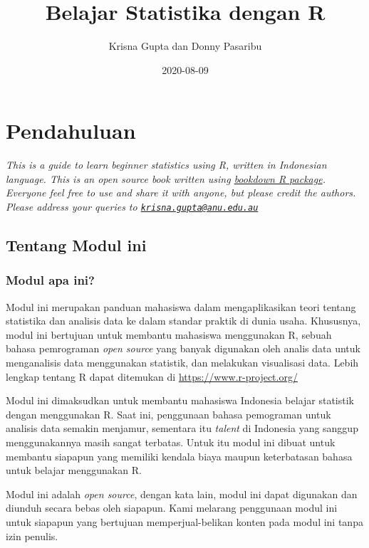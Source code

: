 \documentclass[
]{book}
\title{Belajar Statistika dengan R}
\author{Krisna Gupta dan Donny Pasaribu}
\date{2020-08-09}
\begin{document}
\maketitle

{
\setcounter{tocdepth}{1}
\tableofcontents
}
\hypertarget{pendahuluan}{%
\chapter{Pendahuluan}\label{pendahuluan}}

\emph{This is a guide to learn beginner statistics using R, written in Indonesian language. This is an open source book written using \href{https://bookdown.org/yihui/bookdown/}{bookdown R package}. Everyone feel free to use and share it with anyone, but please credit the authors. Please address your queries to \href{mailto:krisna.gupta@anu.edu.au}{\nolinkurl{krisna.gupta@anu.edu.au}}}

\hypertarget{tentang-modul-ini}{%
\section{Tentang Modul ini}\label{tentang-modul-ini}}

\hypertarget{modul-apa-ini}{%
\subsection{Modul apa ini?}\label{modul-apa-ini}}

Modul ini merupakan panduan mahasiswa dalam mengaplikasikan teori tentang statistika dan analisis data ke dalam standar praktik di dunia usaha. Khususnya, modul ini bertujuan untuk membantu mahasiswa menggunakan R, sebuah bahasa pemrograman \emph{open source} yang banyak digunakan oleh analis data untuk menganalisis data menggunakan statistik, dan melakukan visualisasi data. Lebih lengkap tentang R dapat ditemukan di \url{https://www.r-project.org/}

Modul ini dimaksudkan untuk membantu mahasiswa Indonesia belajar statistik dengan menggunakan R. Saat ini, penggunaan bahasa pemograman untuk analisis data semakin menjamur, sementara itu \emph{talent} di Indonesia yang sanggup menggunakannya masih sangat terbatas. Untuk itu modul ini dibuat untuk membantu siapapun yang memiliki kendala biaya maupun keterbatasan bahasa untuk belajar menggunakan R.

Modul ini adalah \emph{open source}, dengan kata lain, modul ini dapat digunakan dan diunduh secara bebas oleh siapapun. Kami melarang penggunaan modul ini untuk siapapun yang bertujuan memperjual-belikan konten pada modul ini tanpa izin penulis.
\end{document}
